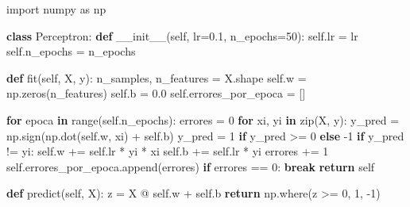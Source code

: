 \documentclass[
  letterpaper,
  DIV=11,
  numbers=noendperiod]{scrartcl}
\newenvironment{Shaded}{\begin{snugshade}}{\end{snugshade}}
\newcommand{\BuiltInTok}[1]{\textcolor[rgb]{0.00,0.23,0.31}{#1}}
\newcommand{\ControlFlowTok}[1]{\textcolor[rgb]{0.00,0.23,0.31}{\textbf{#1}}}
\newcommand{\DecValTok}[1]{\textcolor[rgb]{0.68,0.00,0.00}{#1}}
\newcommand{\FloatTok}[1]{\textcolor[rgb]{0.68,0.00,0.00}{#1}}
\newcommand{\FunctionTok}[1]{\textcolor[rgb]{0.28,0.35,0.67}{#1}}
\newcommand{\ImportTok}[1]{\textcolor[rgb]{0.00,0.46,0.62}{#1}}
\newcommand{\KeywordTok}[1]{\textcolor[rgb]{0.00,0.23,0.31}{\textbf{#1}}}
\newcommand{\NormalTok}[1]{\textcolor[rgb]{0.00,0.23,0.31}{#1}}
\newcommand{\OperatorTok}[1]{\textcolor[rgb]{0.37,0.37,0.37}{#1}}
\newcommand{\VariableTok}[1]{\textcolor[rgb]{0.07,0.07,0.07}{#1}}
\begin{document}
\protect{}\label{perceptron-impl}
\begin{Shaded}
\begin{Highlighting}[]
\ImportTok{import}\NormalTok{ numpy }\ImportTok{as}\NormalTok{ np}

\KeywordTok{class}\NormalTok{ Perceptron:}
    \KeywordTok{def} \FunctionTok{\_\_init\_\_}\NormalTok{(}\VariableTok{self}\NormalTok{, lr}\OperatorTok{=}\FloatTok{0.1}\NormalTok{, n\_epochs}\OperatorTok{=}\DecValTok{50}\NormalTok{):}
        \VariableTok{self}\NormalTok{.lr }\OperatorTok{=}\NormalTok{ lr}
        \VariableTok{self}\NormalTok{.n\_epochs }\OperatorTok{=}\NormalTok{ n\_epochs}

    \KeywordTok{def}\NormalTok{ fit(}\VariableTok{self}\NormalTok{, X, y):}
\NormalTok{        n\_samples, n\_features }\OperatorTok{=}\NormalTok{ X.shape}
        \VariableTok{self}\NormalTok{.w }\OperatorTok{=}\NormalTok{ np.zeros(n\_features)}
        \VariableTok{self}\NormalTok{.b }\OperatorTok{=} \FloatTok{0.0}
        \VariableTok{self}\NormalTok{.errores\_por\_epoca }\OperatorTok{=}\NormalTok{ []}

        \ControlFlowTok{for}\NormalTok{ epoca }\KeywordTok{in} \BuiltInTok{range}\NormalTok{(}\VariableTok{self}\NormalTok{.n\_epochs):}
\NormalTok{            errores }\OperatorTok{=} \DecValTok{0}
            \ControlFlowTok{for}\NormalTok{ xi, yi }\KeywordTok{in} \BuiltInTok{zip}\NormalTok{(X, y):}
\NormalTok{                y\_pred }\OperatorTok{=}\NormalTok{ np.sign(np.dot(}\VariableTok{self}\NormalTok{.w, xi) }\OperatorTok{+} \VariableTok{self}\NormalTok{.b)}
\NormalTok{                y\_pred }\OperatorTok{=} \DecValTok{1} \ControlFlowTok{if}\NormalTok{ y\_pred }\OperatorTok{\textgreater{}=} \DecValTok{0} \ControlFlowTok{else} \OperatorTok{{-}}\DecValTok{1}
                \ControlFlowTok{if}\NormalTok{ y\_pred }\OperatorTok{!=}\NormalTok{ yi:}
                    \VariableTok{self}\NormalTok{.w }\OperatorTok{+=} \VariableTok{self}\NormalTok{.lr }\OperatorTok{*}\NormalTok{ yi }\OperatorTok{*}\NormalTok{ xi}
                    \VariableTok{self}\NormalTok{.b }\OperatorTok{+=} \VariableTok{self}\NormalTok{.lr }\OperatorTok{*}\NormalTok{ yi}
\NormalTok{                    errores }\OperatorTok{+=} \DecValTok{1}
            \VariableTok{self}\NormalTok{.errores\_por\_epoca.append(errores)}
            \ControlFlowTok{if}\NormalTok{ errores }\OperatorTok{==} \DecValTok{0}\NormalTok{:}
                \ControlFlowTok{break}
        \ControlFlowTok{return} \VariableTok{self}

    \KeywordTok{def}\NormalTok{ predict(}\VariableTok{self}\NormalTok{, X):}
\NormalTok{        z }\OperatorTok{=}\NormalTok{ X }\OperatorTok{@} \VariableTok{self}\NormalTok{.w }\OperatorTok{+} \VariableTok{self}\NormalTok{.b}
        \ControlFlowTok{return}\NormalTok{ np.where(z }\OperatorTok{\textgreater{}=} \DecValTok{0}\NormalTok{, }\DecValTok{1}\NormalTok{, }\OperatorTok{{-}}\DecValTok{1}\NormalTok{)}
\end{Highlighting}
\end{Shaded}
\end{document}
